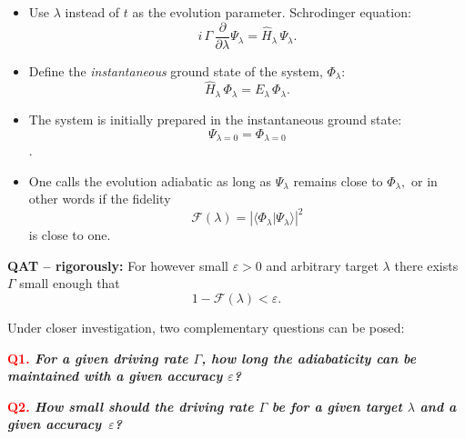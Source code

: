 \documentclass[portratit,a0paper,fontscale=0.48]{baposter} %
\renewcommand{\H}{\hat H}
\newcommand{\be}{\begin{equation}}
\newcommand{\ee}{\end{equation}}
\begin{document}
\begin{poster}
{\begin{multicols}{3}
\begin{itemize}
\item
 Use $\lambda$ instead of $t$ as the evolution parameter. Schrodinger equation:
\be\label{Schrodinger equation}
i\,\Gamma\, \frac{\partial}{\partial \lambda} \Psi_\lambda = \H_{\lambda}\,
\Psi_\lambda.
\ee

\item
Define the {\it instantaneous} ground state of the system, $\Phi_\lambda$:
\be\label{eigenproblem}
\H_\lambda\, \Phi_\lambda = E_\lambda \, \Phi_\lambda.
\ee


\item
The system is initially prepared  in the instantaneous ground state:
$$\Psi_{\lambda=0}=\Phi_{\lambda=0}$$.

\item

 One calls the evolution adiabatic as long
as $\Psi_\lambda$ remains close to $\Phi_{\lambda},$ or in other words if the
fidelity
\begin{equation}\nonumber
 \mathcal F(\lambda) = \left | \langle \Phi_\lambda
 \vert \Psi_\lambda \rangle\right|^2
\end{equation}
is close to one.

\end{itemize}

\vspace{4 pt}





{\bf \cal QAT -- rigorously:} For however small $\varepsilon>0$ and arbitrary target $\lambda$
there exists $\Gamma$ small enough that
\be\label{adiabaticity}
1-\mathcal F(\lambda)<\varepsilon.\nonumber
\ee

\vspace{4 pt}

Under closer investigation, two complementary questions can be posed:

\vspace{4 pt}

\textbf{\textcolor{red}{Q1.} \textit{ For a given driving rate $\Gamma$, how long the adiabaticity can be maintained with a given accuracy $\varepsilon$? }}

\vspace{4 pt}

\textbf{\textcolor{red}{Q2.} \textit{How small should the driving rate $\Gamma$  be for a given target $\lambda$ and a given accuracy~$\varepsilon$?}}

\vspace{7 pt}




\end{multicols}}
\end{poster}
\end{document}
